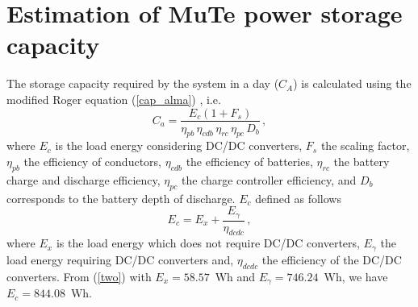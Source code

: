 \documentclass[letterpaper,11pt]{article}
\begin{document}







\appendix
\section{Estimation of MuTe power storage capacity}
\label{ApA}

The storage capacity required by the system in a day ($C_A$) is calculated using the modified Roger equation (\ref{cap_alma}) \cite{messenger2017photovoltaic}, i.e. 
\begin{equation}
C_a=\frac{E_c(1+F_s)}{\eta_{pb}\, \eta_{cdb} \, \eta_{rc} \, \eta_{pc}\, D_{b}} \, , \label{cap_alma}
\end{equation}
where $E_c$ is the load energy considering DC/DC converters, $F_s$ the scaling factor, $\eta_{pb}$ the efficiency of conductors, $\eta_{cdb}$ the efficiency of batteries, $\eta_{rc}$ the battery charge and discharge efficiency, $\eta_{pc}$ the charge controller efficiency, and $D_{b}$ corresponds to the battery depth of discharge. $E_c$ defined as follows
\begin{equation}
E_c=E_x+\frac{E_{\gamma}}{\eta_{dcdc}} \, ,
\label{two}
\end{equation}
where $E_{x}$ is the load energy which does not require DC/DC converters, $E_{\gamma}$ the load energy requiring DC/DC converters and, $\eta_{dcdc}$ the efficiency of the DC/DC converters. From (\ref{two}) with $E_{x}=58.57$~Wh and $E_{\gamma}=746.24$~Wh, we have $E_c=844.08$~Wh. 
\end{document}
